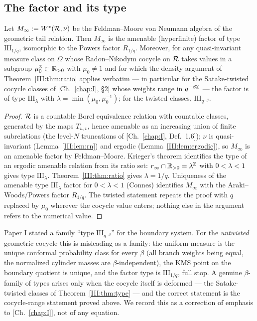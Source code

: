\subsection{The factor and its type}

\begin{theorem}\label{III:thm:type}
Let $M_\infty:=W^*(\mathcal{R},\nu)$ be the Feldman--Moore von Neumann algebra of the
geometric tail relation. Then $M_\infty$ is the amenable (hyperfinite) factor of type
$\mathrm{III}_{1/q}$, isomorphic to the Powers factor $R_{1/q}$. Moreover, for any
quasi-invariant measure class on $\Omega$ whose Radon--Nikodym cocycle on $\mathcal{R}$ takes
values in a subgroup $\mu_0^{\mathbb{Z}}\subset\mathbb{R}_{>0}$ with $\mu_0\neq1$ and for which the
density argument of Theorem~\ref{III:thm:ratio} applies verbatim --- in particular for the
Satake-twisted cocycle classes of [Ch.~\ref{chap:I}, \S2] whose weights range in $q^{-\beta\mathbb{Z}}$ ---
the factor is of type $\mathrm{III}_{\lambda}$ with
$\lambda=\min(\mu_0,\mu_0^{-1})$; for the twisted classes,
$\mathrm{III}_{q^{-\beta}}$.
\end{theorem}

\begin{proof}
$\mathcal{R}$ is a countable Borel equivalence relation with countable classes, generated by
the maps $T_{u,v}$, hence amenable as an increasing union of finite subrelations
(the level-$N$ truncations of [Ch.~\ref{chap:I}, Def.~1.6]); $\nu$ is quasi-invariant
(Lemma~\ref{III:lem:rn}) and ergodic (Lemma~\ref{III:lem:ergodic}), so $M_\infty$ is an
amenable factor by Feldman--Moore. Krieger's theorem identifies the type of an ergodic
amenable relation from its ratio set: $r_\infty\cap\mathbb{R}_{>0}=\lambda^{\mathbb{Z}}$ with
$0<\lambda<1$ gives type $\mathrm{III}_\lambda$. Theorem~\ref{III:thm:ratio} gives
$\lambda=1/q$. Uniqueness of the amenable type $\mathrm{III}_\lambda$ factor for
$0<\lambda<1$ (Connes) identifies $M_\infty$ with the Araki--Woods/Powers factor
$R_{1/q}$. The twisted statement repeats the proof with $q$ replaced by $\mu_0$
wherever the cocycle value enters; nothing else in the argument refers to the
numerical value.
\end{proof}

\begin{remark}
\label{III:rem:correction}
Paper I stated a family ``type $\mathrm{III}_{q^{-\beta}}$'' for the boundary system.
For the \emph{untwisted} geometric cocycle this is misleading as a family: the uniform
measure is the unique conformal probability class for every $\beta$ (all branch
weights being equal, the normalized cylinder masses are $\beta$-independent), the KMS
point on the boundary quotient is unique, and the factor type is
$\mathrm{III}_{1/q}$, full stop. A genuine $\beta$-family of types arises only when
the cocycle itself is deformed --- the Satake-twisted classes of
Theorem~\ref{III:thm:type} --- and the correct statement is the cocycle-range statement
proved above. We record this as a correction of emphasis to [Ch.~\ref{chap:I}], not of any equation.
\end{remark}

